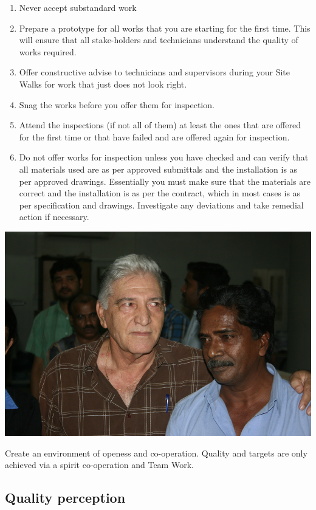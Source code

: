 \begin{enumerate}
\item Never accept substandard work
\item Prepare a prototype for all works that you are starting for the 
 first time. This will ensure that all stake-holders and technicians understand
the quality of works required.
\item Offer constructive advise to technicians and supervisors during your
Site Walks for work that just does not look right.
\item Snag the works before you  offer them for inspection.
\item Attend the inspections (if not all of them) at least the ones that 
are offered for the first time or that have failed and are offered again for
inspection.
\item Do not offer works for inspection unless you have checked and can verify
that all materials used are as per approved submittals and the installation is as
per approved drawings. Essentially you must make sure that the materials are
correct and the installation is as per the contract, which in most cases is as
per specification and drawings. Investigate any deviations and take remedial
action if necessary.
\end{enumerate}


\begin{marginfigure}
\includegraphics[width=\textwidth]{./graphics/team-spirit}
\caption{Create an environment of openess and co-operation. Quality and targets
are only achieved via a spirit co-operation and Team Work.}
\end{marginfigure}
\subsection*{Quality perception}

